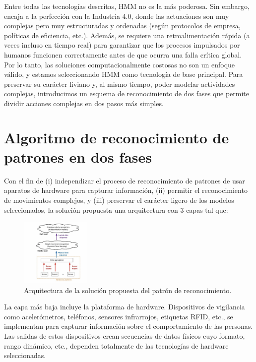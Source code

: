 \documentclass{article}
\begin{document}
Entre todas las tecnologías descritas, HMM no es la más poderosa. Sin embargo, encaja a la perfección con la Industria 4.0, donde las actuaciones son muy complejas pero muy estructuradas y ordenadas (según protocolos de empresa, políticas de eficiencia, etc.). Además, se requiere una retroalimentación rápida (a veces incluso en tiempo real) para garantizar que los procesos impulsados por humanos funcionen correctamente antes de que ocurra una falla crítica global. Por lo tanto, las soluciones computacionalmente costosas no son un enfoque válido, y estamos seleccionando HMM como tecnología de base principal. Para preservar su carácter liviano y, al mismo tiempo, poder modelar actividades complejas, introducimos un esquema de reconocimiento de dos fases que permite dividir acciones complejas en dos pasos más simples.
\section {Algoritmo de reconocimiento de patrones en dos fases}

Con el fin de (i) independizar el proceso de reconocimiento de patrones de usar aparatos de hardware para capturar información, (ii) permitir el reconocimiento de movimientos complejos, y (iii) preservar el carácter ligero de los modelos seleccionados, la solución propuesta una arquitectura con 3 capas tal que:


\begin{figure}[h]
\centering
\includegraphics[width=0.3\textwidth]{punto3.png}
\caption{\label{fig:frog}Arquitectura de la solución propuesta del patrón de reconocimiento.}
\end{figure}

La capa más baja incluye la plataforma de hardware. Dispositivos de vigilancia como
acelerómetros, teléfonos, sensores infrarrojos, etiquetas RFID, etc., se implementan para
capturar información sobre el comportamiento de las personas. Las salidas de estos dispositivos crean
secuencias de datos físicos cuyo formato, rango dinámico, etc., dependen totalmente de
las tecnologías de hardware seleccionadas.
\end{document}
